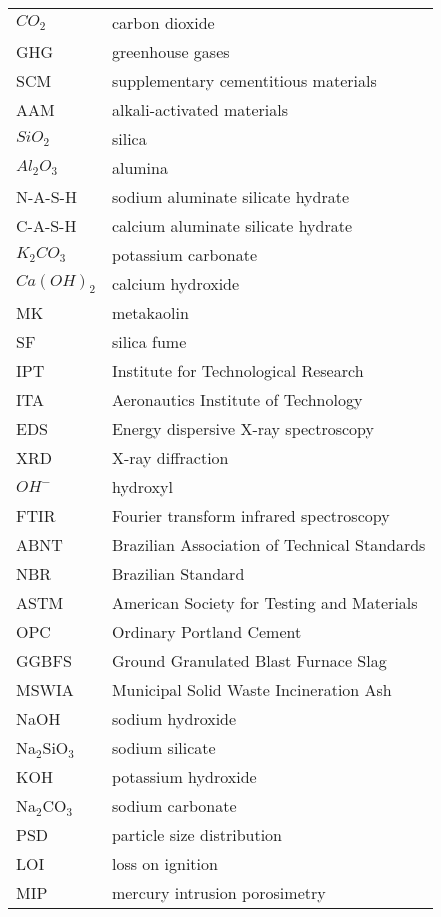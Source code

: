 \begin{longtable}{ll}
$CO_2$ & carbon dioxide \\
GHG & greenhouse gases \\
SCM & supplementary cementitious materials \\
AAM & alkali-activated materials \\
$ SiO_2$ & silica \\
$ Al_2O_3$ & alumina \\
N-A-S-H & sodium aluminate silicate hydrate \\
C-A-S-H & calcium aluminate silicate hydrate  \\
$K_2CO_3$ & potassium carbonate \\
$Ca(OH)_2$ & calcium hydroxide \\
MK & metakaolin \\
SF & silica fume \\
IPT & Institute for Technological Research \\
ITA & Aeronautics Institute of Technology \\
EDS & Energy dispersive X-ray spectroscopy \\
XRD & X-ray diffraction \\
$OH^-$ & hydroxyl \\
FTIR & Fourier transform infrared spectroscopy \\
ABNT & Brazilian Association of Technical Standards \\
NBR & Brazilian Standard \\
ASTM & American Society for Testing and Materials \\
OPC & Ordinary Portland Cement \\
GGBFS & Ground Granulated Blast Furnace Slag \\
MSWIA & Municipal Solid Waste Incineration Ash \\
NaOH & sodium hydroxide \\
Na$_2$SiO$_3$ & sodium silicate \\
KOH & potassium hydroxide \\
Na$_2$CO$_3$ & sodium carbonate \\
PSD & particle size distribution \\
LOI & loss on ignition \\
MIP & mercury intrusion porosimetry \\
\end{longtable}